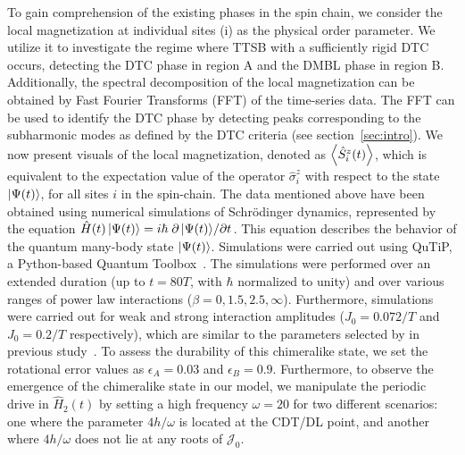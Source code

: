 \documentclass[12pt]{iopart}
\begin{document}
To gain comprehension of the existing phases in the spin chain, we consider the local magnetization at individual sites (i) as the physical order parameter. We utilize it to investigate the regime where TTSB with a sufficiently rigid DTC occurs, detecting the DTC phase in region A and the DMBL phase in region B. Additionally, the spectral decomposition of the local magnetization can be obtained by Fast Fourier Transforms (FFT) of the time-series data. The FFT can be used to identify the DTC phase by detecting peaks corresponding to the subharmonic modes as defined by the DTC criteria (see section~\ref{sec:intro}). We now present visuals of the local magnetization, denoted as $\expval{\hat{S}^z_i (t)}$, which is equivalent to the expectation value of the operator $\hat{\sigma}^z_i$ with respect to the state $\ket{\Psi(t)}$, for all sites $i$ in the spin-chain. The data mentioned above have been obtained using numerical simulations of Schr\"odinger dynamics, represented by the equation $\hat{H}(t)\ket{\Psi(t)}= i \hbar \pdv*{\ket{\Psi(t)}}{t}$. This equation describes the behavior of the quantum many-body state $\ket{\Psi(t)}$. Simulations were carried out using QuTiP, a Python-based Quantum Toolbox~\cite{Johansson2013}. The simulations were performed over an extended duration (up to $t = 80T$, with $\hbar$ normalized to unity) and over various ranges of power law interactions ($\beta = 0,1.5,2.5,\infty$). Furthermore, simulations were carried out for weak and strong interaction amplitudes ($J_0 = 0.072/T$ and $J_0 = 0.2/T$ respectively), which are similar to the parameters selected by in previous study~\cite{sakurai_phys_nodate,zhang_observation_2017}. To assess the durability of this chimeralike state, we set the rotational error values as $\epsilon_A = 0.03$ and $\epsilon_B = 0.9$. Furthermore, to observe the emergence of the chimeralike state in our model, we manipulate the periodic drive in $\hat{H}_2(t)$ by setting a high frequency $\omega=20$ for two different scenarios: one where the parameter $4h/\omega$ is located at the CDT/DL point, and another where $4h/\omega$  does not lie at any roots of $\mathcal{J}_0$.
\end{document}
